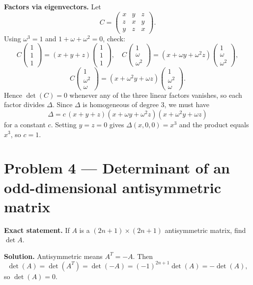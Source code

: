 \documentclass[12pt,a4paper]{article}
\theoremstyle{plain}
\theoremstyle{definition}      %
\begin{document}
\textbf{Factors via eigenvectors.}
Let
\[
C=\begin{pmatrix}
	x&y&z\\
	z&x&y\\
	y&z&x
\end{pmatrix}.
\]
Using \(\omega^3=1\) and \(1+\omega+\omega^2=0\), check:
\[
C\begin{pmatrix}1\\1\\1\end{pmatrix}=(x+y+z)\begin{pmatrix}1\\1\\1\end{pmatrix},\quad
C\begin{pmatrix}1\\\omega\\\omega^2\end{pmatrix}=(x+\omega y+\omega^2 z)\begin{pmatrix}1\\\omega\\\omega^2\end{pmatrix},
\]
\[
C\begin{pmatrix}1\\\omega^2\\\omega\end{pmatrix}=(x+\omega^2 y+\omega z)\begin{pmatrix}1\\\omega^2\\\omega\end{pmatrix}.
\]
Hence \(\det(C)=0\) whenever any of the three linear factors vanishes, so each factor divides \(\Delta\).
Since \(\Delta\) is homogeneous of degree \(3\), we must have
\[
\Delta=c\,(x+y+z)(x+\omega y+\omega^2 z)(x+\omega^2 y+\omega z)
\]
for a constant \(c\). Setting \(y=z=0\) gives \(\Delta(x,0,0)=x^3\) and the product equals \(x^3\), so \(c=1\).


\section*{Problem 4 — Determinant of an odd-dimensional antisymmetric matrix}

\textbf{Exact statement.}
If \(A\) is a \((2n+1)\times(2n+1)\) antisymmetric matrix, find \(\det A\).

\textbf{Solution.}
Antisymmetric means \(A^T=-A\). Then
\[
\det(A)=\det(A^T)=\det(-A)=(-1)^{2n+1}\det(A)=-\det(A),
\]
so \(\det(A)=0\).
\end{document}
